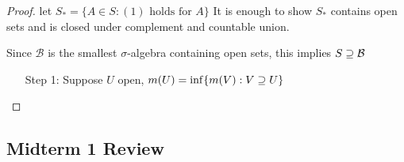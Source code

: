 \begin{proof}
	let $S_{*} = \{A \in S: (1) \text{ holds for $A$} \}$
It is enough to show $S_{*}$ contains open sets and is closed under complement and countable union.

Since $\mathcal{B}$ is the smallest $\sigma$-algebra containing open sets, this implies $S \supseteq \mathcal{B}$

\begin{enumerate}
	\item[Step 1:] Suppose $U$ open, $m(U) = \inf\{m(V) : V \supseteq U \}$
\end{enumerate}
\end{proof}


\subsection*{Midterm 1 Review}


